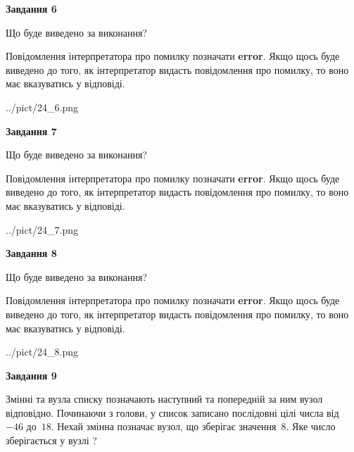 \documentclass[12pt, ukrainian]{article}
\begin{document}
{\begin {large}
{\begin {center}\textbf{Завдання 6}\end {center}}\par
Що буде виведено за виконання?

Повідомлення інтерпретатора про помилку позначати \textbf{error}.
Якщо щось буде виведено до того, як інтерпретатор видасть повідомлення про помилку, 
то воно має вказуватись у відповіді. \par


\begin{center}
	{../pict/24_6.png}
\end{center}
\newpage

{\begin {center}\textbf{Завдання 7}\end {center}}\par
Що буде виведено за виконання?

Повідомлення інтерпретатора про помилку позначати \textbf{error}.
Якщо щось буде виведено до того, як інтерпретатор видасть повідомлення про помилку, 
то воно має вказуватись у відповіді. \par


\begin{center}
	{../pict/24_7.png}
\end{center}
\newpage

{\begin {center}\textbf{Завдання 8}\end {center}}\par
Що буде виведено за виконання?

Повідомлення інтерпретатора про помилку позначати \textbf{error}.
Якщо щось буде виведено до того, як інтерпретатор видасть повідомлення про помилку, 
то воно має вказуватись у відповіді. \par


\begin{center}
	{../pict/24_8.png}
\end{center}
\newpage

{\begin {center}\textbf{Завдання 9}\end {center}}\par
Змінні  та  вузла списку позначають наступний та попередній за ним вузол відповідно. Починаючи з голови, у список записано послідовні цілі числа від~$-46$ до~$18$. Нехай змінна  позначає вузол, що зберігає значення~$8$.
Яке число зберігається у вузлі  ?\par
\newpage


\end{large}}
\end{document}

